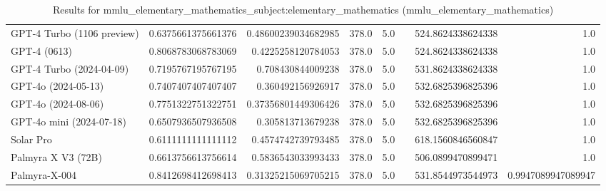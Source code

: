 \begin{table}[htp]
{\begin{tabular}{lrrrrrrr}
GPT-4 Turbo (1106 preview) & 0.6375661375661376 & 0.48600239034682985 & 378.0 & 5.0 &  & 524.8624338624338 & 1.0 \\
GPT-4 (0613) & 0.8068783068783069 & 0.4225258120784053 & 378.0 & 5.0 &  & 524.8624338624338 & 1.0 \\
GPT-4 Turbo (2024-04-09) & 0.7195767195767195 & 0.708430844009238 & 378.0 & 5.0 &  & 531.8624338624338 & 1.0 \\
GPT-4o (2024-05-13) & 0.7407407407407407 & 0.360492156926917 & 378.0 & 5.0 &  & 532.6825396825396 & 1.0 \\
GPT-4o (2024-08-06) & 0.7751322751322751 & 0.37356801449306426 & 378.0 & 5.0 &  & 532.6825396825396 & 1.0 \\
GPT-4o mini (2024-07-18) & 0.6507936507936508 & 0.305813713679238 & 378.0 & 5.0 &  & 532.6825396825396 & 1.0 \\
Solar Pro & 0.6111111111111112 & 0.4574742739793485 & 378.0 & 5.0 &  & 618.1560846560847 & 1.0 \\
Palmyra X V3 (72B) & 0.6613756613756614 & 0.5836543033993433 & 378.0 & 5.0 &  & 506.0899470899471 & 1.0 \\
Palmyra-X-004 & 0.8412698412698413 & 0.31325215069705215 & 378.0 & 5.0 &  & 531.8544973544973 & 0.9947089947089947 \\
\bottomrule
\end{tabular}}
\caption{Results for mmlu_elementary_mathematics_subject:elementary_mathematics (mmlu_elementary_mathematics)}
\label{fig:mmlu_elementary_mathematics_subject:elementary_mathematics (mmlu_elementary_mathematics)}
\end{table}
